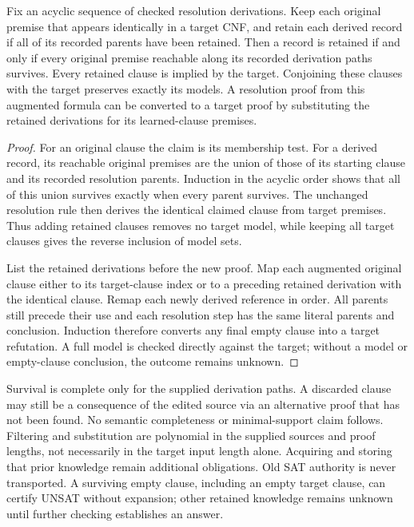 \begin{proposition}
Fix an acyclic sequence of checked resolution derivations.  Keep each original
premise that appears identically in a target CNF, and retain each derived record
if all of its recorded parents have been retained.  Then a record is retained
if and only if every original premise reachable along its recorded derivation
paths survives.  Every retained clause is implied by the target.  Conjoining
these clauses with the target preserves exactly its models.  A resolution proof
from this augmented formula can be converted to a target proof by substituting
the retained derivations for its learned-clause premises.
\end{proposition}
\begin{proof}
For an original clause the claim is its membership test.  For a derived record,
its reachable original premises are the union of those of its starting clause
and its recorded resolution parents.  Induction in the acyclic order shows that
all of this union survives exactly when every parent survives.  The unchanged
resolution rule then derives the identical claimed clause from target premises.
Thus adding retained clauses removes no target model, while keeping all target
clauses gives the reverse inclusion of model sets.

List the retained derivations before the new proof.  Map each augmented original
clause either to its target-clause index or to a preceding retained derivation
with the identical clause.  Remap each newly derived reference in order.  All
parents still precede their use and each resolution step has the same literal
parents and conclusion.  Induction therefore converts any final empty clause
into a target refutation.  A full model is checked directly against the target;
without a model or empty-clause conclusion, the outcome remains unknown.
\end{proof}

Survival is complete only for the supplied derivation paths.  A discarded clause
may still be a consequence of the edited source via an alternative proof that
has not been found.  No semantic completeness or minimal-support claim follows.
Filtering and substitution are polynomial in the supplied sources and proof
lengths, not necessarily in the target input length alone.  Acquiring and
storing that prior knowledge remain additional obligations.
Old SAT authority is never transported.  A surviving empty clause, including an
empty target clause, can certify UNSAT without expansion; other retained
knowledge remains unknown until further checking establishes an answer.

